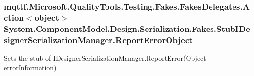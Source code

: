 \hypertarget{class_system_1_1_component_model_1_1_design_1_1_serialization_1_1_fakes_1_1_stub_i_designer_serialization_manager_a5d92add025bc914d1050f0502dc64d51}{
\subsubsection[{Report\-Error\-Object}]{\setlength{\rightskip}{0pt plus 5cm}mqttf.\-Microsoft.\-Quality\-Tools.\-Testing.\-Fakes.\-Fakes\-Delegates.\-Action$<$object$>$ System.\-Component\-Model.\-Design.\-Serialization.\-Fakes.\-Stub\-I\-Designer\-Serialization\-Manager.\-Report\-Error\-Object}}\label{class_system_1_1_component_model_1_1_design_1_1_serialization_1_1_fakes_1_1_stub_i_designer_serialization_manager_a5d92add025bc914d1050f0502dc64d51}


Sets the stub of I\-Designer\-Serialization\-Manager.\-Report\-Error(\-Object error\-Information)

